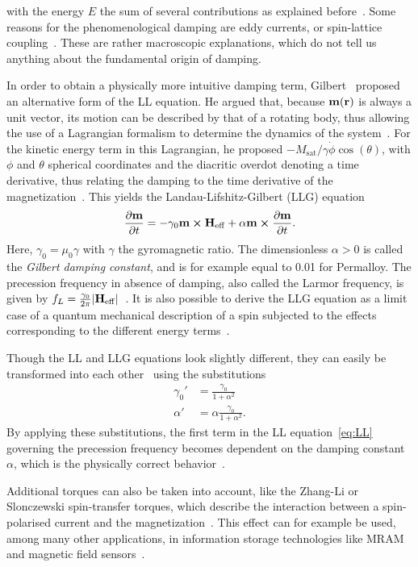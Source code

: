 \documentclass[11pt,a4paper,english]{article}
\begin{document}
with the energy $E$ the sum of several contributions as explained before~\cite{ThermFluc_SingleDomain}. Some reasons for the phenomenological damping are eddy currents, or spin-lattice coupling~\cite{phd_leliaert}. These are rather macroscopic explanations, which do not tell us anything about the fundamental origin of damping.
\par
In order to obtain a physically more intuitive damping term, Gilbert~\cite{Gilbert1955ALF} proposed an alternative form of the LL equation. He argued that, because $\vb{m}(\vb{r})$ is always a unit vector, its motion can be described by that of a rotating body, thus allowing the use of a Lagrangian formalism to determine the dynamics of the system~\cite{abert2013discrete}. For the kinetic energy term in this Lagrangian, he proposed $-M_\mathrm{sat}/\gamma \dot{\phi} \cos(\theta)$, with $\phi$ and $\theta$ spherical coordinates and the diacritic overdot denoting a time derivative, thus relating the damping to the time derivative of the magnetization~\cite{abert2013discrete}. This yields the Landau-Lifshitz-Gilbert (LLG) equation~\cite{ThermFluc_SingleDomain, phd_leliaert, LEL-17b}
\begin{equation}
    \frac{\partial \vb{m}}{\partial t} = - \gamma_0 \vb{m} \cross \vb{H_\mathrm{eff}} + \alpha \vb{m} \cross \frac{\partial \vb{m}}{\partial t} \mathrm{.}
    \label{eq:LLG}
\end{equation}
Here, $\gamma_0=\mu_0 \gamma$ with $\gamma$ the gyromagnetic ratio. The dimensionless $\alpha > 0$ is called the \textit{Gilbert damping constant}, and is for example equal to 0.01 for Permalloy. The precession frequency in absence of damping, also called the Larmor frequency, is given by  $f_L=\frac{\gamma_0}{2\pi}\abs{\vb{H_\mathrm{eff}}}$~\cite{phd_leliaert}.
It is also possible to derive the LLG equation as a limit case of a quantum mechanical description of a spin subjected to the effects corresponding to the different energy terms~\cite{abert2013discrete,bode2012current}. \par
Though the LL and LLG equations look slightly different, they can easily be transformed into each other~\cite{ThermFluc_SingleDomain,phd_leliaert} using the substitutions
\begin{align*}
    \gamma_0' &= \frac{\gamma_0}{1+\alpha^2} \\
    \alpha' &= \alpha \frac{\gamma_0}{1+\alpha^2} \mathrm{.}
\end{align*}
By applying these substitutions, the first term in the LL equation~\eqref{eq:LL} governing the precession frequency becomes dependent on the damping constant $\alpha$, which is the physically correct behavior~\cite{phd_leliaert}. \par
Additional torques can also be taken into account, like the Zhang-Li or Slonczewski spin-transfer torques, which describe the interaction between a spin-polarised current and the magnetization~\cite{ZhangLiSpinTransferTorque, MuMax3, syllabus_PoAEaPD}. This effect can for example be used, among many other applications, in information storage technologies like MRAM and magnetic field sensors~\cite{syllabus_PoAEaPD}.
\end{document}
